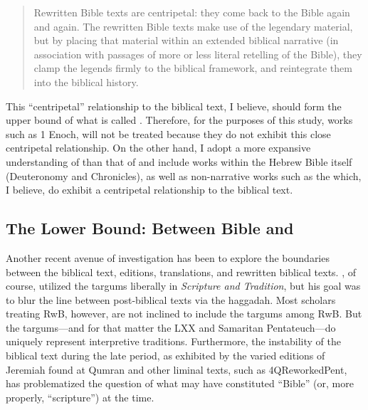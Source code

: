 \begin{quote}
Rewritten Bible texts are centripetal: they come back to the Bible again
and again. The rewritten Bible texts make use of the legendary material,
but by placing that material within an extended biblical narrative (in
association with passages of more or less literal retelling of the
Bible), they clamp the legends firmly to the biblical framework, and
reintegrate them into the biblical history.
\autocite[117]{alexander_carson-williamson1988}
\end{quote}

This ``centripetal'' relationship to the biblical text, I believe,
should form the upper bound of what is called \rwb.
Therefore, for the purposes of this study, works such as 1 Enoch, will
not be treated because they do not exhibit this close centripetal
relationship. On the other hand, I adopt a more expansive understanding
of \rwb than that of \vermes and include
works within the Hebrew Bible itself (Deuteronomy and Chronicles), as
well as non-narrative works such as the \templescroll
which, I believe, do exhibit a centripetal relationship to the biblical
text.

\hypertarget{the-lower-bound-between-bible-and-rwb}{%
\subsection{The Lower Bound: Between Bible and
\RWB}\label{the-lower-bound-between-bible-and-rwb}}

Another recent avenue of investigation has been to explore the
boundaries between the biblical text, editions, translations, and
rewritten biblical texts. \vermes, of course, utilized
the targums liberally in \emph{Scripture and Tradition}, but his goal
was to blur the line between post-biblical texts via the haggadah. Most
scholars treating RwB, however, are not inclined to include the targums
among RwB. But the targums---and for that matter the LXX and Samaritan
Pentateuch---do uniquely represent interpretive traditions. Furthermore,
the instability of the biblical text during the late \secondtemple
period, as exhibited by the varied editions of Jeremiah found at Qumran
and other liminal texts, such as 4QReworkedPent, has problematized the
question of what may have constituted ``Bible'' (or, more properly,
``scripture'') at the time.

